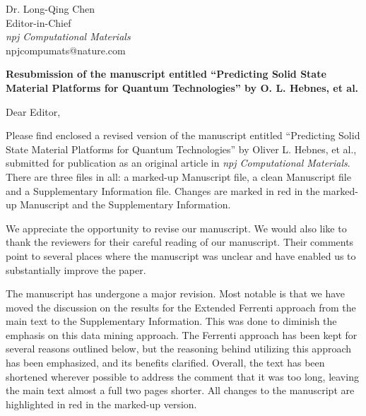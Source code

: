 \documentclass[11pt, a4paper]{letter} %
\begin{document}

\begin{letter}{
	Dr. Long-Qing Chen\\
	Editor-in-Chief\\
	\textit{npj Computational Materials} \\ 
	npjcompumats@nature.com \\ 
}


\opening{}

\begin{center}
   \textbf{Resubmission of the manuscript entitled “Predicting Solid State Material Platforms for Quantum Technologies” by O. L. Hebnes, et al.}
\end{center}

\noindent
Dear Editor, 

Please find enclosed a revised version of the manuscript entitled “Predicting Solid State Material Platforms for Quantum Technologies” by Oliver L. Hebnes, et al., submitted for publication as an original article in \textit{npj Computational Materials}. There are three files in all: a marked-up Manuscript file, a clean Manuscript file and a Supplementary Information file. Changes are marked in red in the marked-up Manuscript and the Supplementary Information. 

We appreciate the opportunity to revise our manuscript. We would also like to thank the reviewers for their careful reading of our manuscript. Their comments point to several places where the manuscript was unclear and have enabled us to substantially improve the paper. 

The manuscript has undergone a major revision. Most notable is that we have moved the discussion on the results for the Extended Ferrenti approach from the main text to the Supplementary Information. This was done to diminish the emphasis on this data mining approach. The Ferrenti approach has been kept for several reasons outlined below, but the reasoning behind utilizing this approach has been emphasized, and its benefits clarified. Overall, the text has been shortened wherever possible to address the comment that it was too long, leaving the main text almost a full two pages shorter. All changes to the manuscript are highlighted in red in the marked-up version. 


\end{letter}
\end{document}

